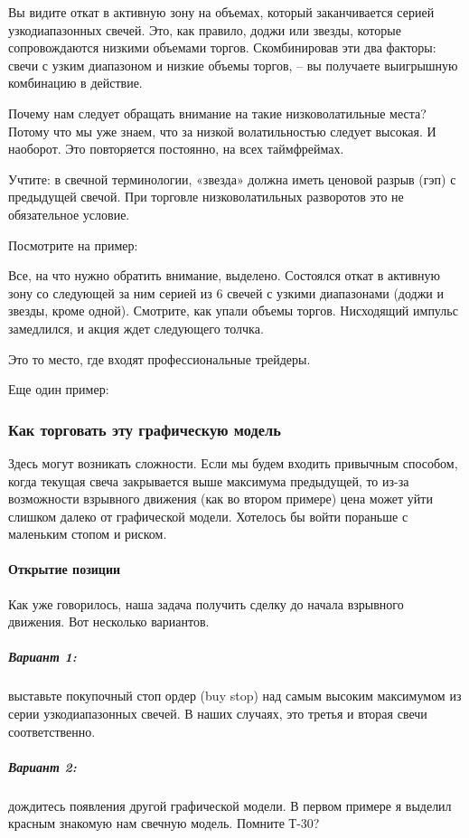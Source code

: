 \documentclass{book}
\begin{document}
Вы видите откат в активную зону на объемах, который заканчивается серией узкодиапазонных свечей. Это, как правило, доджи или звезды, которые сопровождаются низкими объемами торгов. Скомбинировав эти два факторы: свечи с узким диапазоном и низкие объемы торгов, – вы получаете выигрышную комбинацию в действие.

Почему нам следует обращать внимание на такие низковолатильные места? Потому что мы уже знаем, что за низкой волатильностью следует высокая. И наоборот. Это повторяется постоянно, на всех таймфреймах.

Учтите: в свечной терминологии, «звезда» должна иметь ценовой разрыв (гэп) с предыдущей свечой. При торговле низковолатильных разворотов это не обязательное условие.

Посмотрите на пример:

Все, на что нужно обратить внимание, выделено. Состоялся откат в активную зону со следующей за ним серией из 6 свечей с узкими диапазонами (доджи и звезды, кроме одной). Смотрите, как упали объемы торгов. Нисходящий импульс замедлился, и акция ждет следующего толчка.

Это то место, где входят профессиональные трейдеры.

Еще один пример:

\subsubsection{Как торговать эту графическую модель}

Здесь могут возникать сложности. Если мы будем входить привычным способом, когда текущая свеча закрывается выше максимума предыдущей, то из-за возможности взрывного движения (как во втором примере) цена может уйти слишком далеко от графической модели. Хотелось бы войти пораньше с маленьким стопом и риском.

\paragraph{Открытие позиции}

Как уже говорилось, наша задача получить сделку до начала взрывного движения. Вот несколько вариантов.

\subparagraph{Вариант 1:} выставьте покупочный стоп ордер (buy stop) над самым высоким максимумом из серии узкодиапазонных свечей. В наших случаях, это третья и вторая свечи соответственно.

\subparagraph{Вариант 2:} дождитесь появления другой графической модели. В первом примере я выделил красным знакомую нам свечную модель. Помните Т-30?
\end{document}

